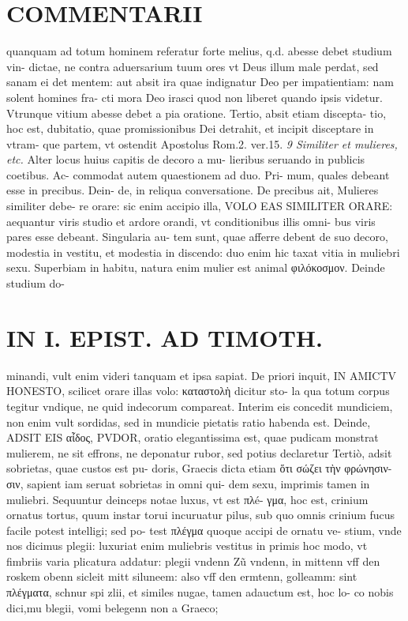 \documentclass{article}
\begin{document}
\begin{pages}
\section*{COMMENTARII }
\marginpar{[ p.5 ]}\pstart quanquam ad totum hominem referatur forte melius, q.d. abesse debet studium vin- dictae, ne contra aduersarium tuum ores vt Deus illum male perdat, sed sanam ei det mentem: aut absit ira quae indignatur Deo per impatientiam: nam solent homines fra- cti mora Deo irasci quod non liberet quando ipsis videtur. Vtrunque vitium abesse debet a pia oratione. Tertio, absit etiam discepta- tio, hoc est, dubitatio, quae promissionibus Dei detrahit, et incipit disceptare in vtram- que partem, vt ostendit Apostolus Rom.2. ver.15.  \pend
\textit{9 Similiter et mulieres, etc. }\pstart Alter locus huius capitis de decoro a mu- lieribus seruando in publicis coetibus. Ac- commodat autem quaestionem ad duo. Pri- mum, quales debeant esse in precibus. Dein- de, in reliqua conversatione.  \pend\pstart De precibus ait, Mulieres similiter debe- re orare: sic enim accipio illa, VOLO EAS SIMILITER ORARE: aequantur viris studio et ardore orandi, vt conditionibus illis omni- bus viris pares esse debeant. Singularia au- tem sunt, quae afferre debent de suo decoro, modestia in vestitu, et modestia in discendo: duo enim hic taxat vitia in muliebri sexu. Superbiam in habitu, natura enim mulier est animal φιλόκοσμον. Deinde studium do-  \pend
\section*{IN I. EPIST. AD TIMOTH. }
\marginpar{[ p.55 ]}\pstart minandi, vult enim videri tanquam et ipsa sapiat.  \pend\pstart De priori inquit, IN AMICTV HONESTO, scilicet orare illas volo: καταστολὴ dicitur sto- la qua totum corpus tegitur vndique, ne quid indecorum compareat. Interim eis concedit mundiciem, non enim vult sordidas, sed in mundicie pietatis ratio habenda est.  \pend\pstart Deinde, ADSIT EIS αἶδος, PVDOR, oratio elegantissima est, quae pudicam monstrat mulierem, ne sit effrons, ne deponatur rubor, sed potius declaretur  \pend\pstart Tertiò, adsit sobrietas, quae custos est pu- doris, Graecis dicta etiam ὅτι σώζει τὴν φρώνησιν- σιν, sapient iam seruat sobrietas in omni qui- dem sexu, imprimis tamen in muliebri.  \pend\pstart Sequuntur deinceps notae luxus, vt est πλé- γμα, hoc est, crinium ornatus tortus, quum instar torui incuruatur pilus, sub quo omnis crinium fucus facile potest intelligi; sed po- test πλέγμα quoque accipi de ornatu ve- stium, vnde nos dicimus plegii: luxuriat enim muliebris vestitus in primis hoc modo, vt fimbriis varia plicatura addatur: plegii vndenn Zũ vndenn, in mittenn vff den roskem obenn sicleit mitt siluneem: also vff den ermtenn, golleamm: sint πλέγματα, schnur spi zlii, et similes nugae, tamen adauctum est, hoc lo- co nobis dici,mu blegii, vomi belegenn non a Graeco;  \pend
\marginpar{[ p.56 ]}

\end{pages}
\end{document}
